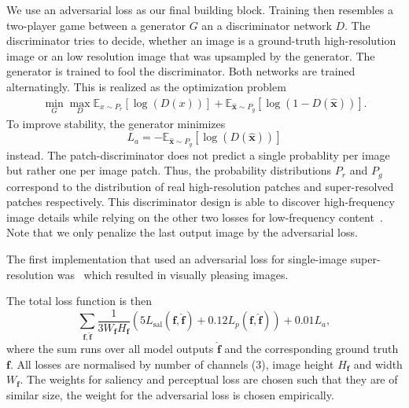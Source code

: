 \documentclass{scrartcl}
\newcommand{\img}{\bm{f}} %
\begin{document}
We use an adversarial loss as our final building block.
Training then resembles a two-player game between a generator \(G\) an a discriminator network \(D\).
The discriminator tries to decide, whether an image is a ground-truth high-resolution image or an low resolution image that was upsampled by the generator.
The generator is trained to fool the discriminator.
Both networks are trained alternatingly.
This is realized as the optimization problem~\cite{GAN}
\begin{align}
 \min_G \max_D \mathbb{E}_{x \sim P_r} \left[ \log (D({x})) \right] +
  \mathbb{E}_{\hat{\bm{x}} \sim P_g} \left[  \log (1 - D(\hat{\bm{x}})) \right].
\end{align}
To improve stability, the generator minimizes
\begin{equation}
  L_a = - \mathbb{E}_{\hat{\bm{x}} \sim P_g} \left[ \log (D(\hat{\bm{x}})) \right]
\end{equation}
instead.
The patch-discriminator does not predict a single probablity per image but rather one per image patch.
Thus, the probability distributions $P_r$ and $P_g$ correspond to the distribution of real high-resolution patches and super-resolved patches respectively.
This discriminator design is able to discover high-frequency image details while relying on the other two losses for low-frequency content~\cite{PatchGAN}.
Note that we only penalize the last output image by the adversarial loss.

The first implementation that used an adversarial loss for single-image super-resolution was~\cite{SRGAN} which resulted in visually pleasing images.

The total loss function is then
\begin{equation}
  \label{eq:total-loss}
\sum_{\img, \hat{\img}}
\frac{1}{3 W_{\img} H_{\img}}
  \left( 5 L_{\text{sal}} (\img, \hat{\img}) + 0.12  L_p(\img, \hat{\img}) \right) + 0.01 L_a,
\end{equation}
where the sum runs over all model outputs \(\hat{\img}\) and the corresponding ground truth \(\img\).
All losses are normalised by number of channels (3), image height \(H_{\img}\) and width \(W_{\img}\).
The weights for saliency and perceptual loss are chosen such that they are of similar size, the weight for the adversarial loss is chosen empirically.
\end{document}
